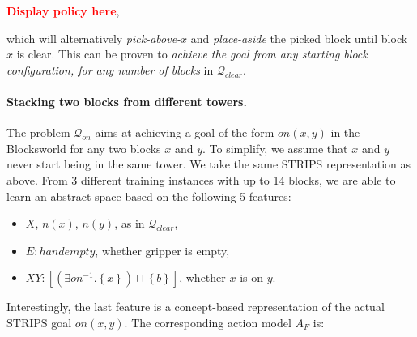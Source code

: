 \documentclass[letterpaper]{article} %
\newcommand{\set}[1]{\ensuremath{\left\{#1 \right\}}}
\newcommand{\alert}[1]{\textcolor{red}{\bf #1}}
\newcommand{\Q}{\mathcal{Q}}
\begin{document}
\alert{Display policy here},

\noindent which will alternatively \emph{pick-above-$x$} and \emph{place-aside} the picked block 
until block $x$ is clear. This can be proven to \emph{achieve the goal from any starting block configuration, for any number of blocks} in 
$\Q_{clear}$.

% 

% 

\paragraph{Stacking two blocks from different towers.}
The problem $\Q_{on}$ aims at achieving a goal of the form $on(x,y)$
in the Blocksworld for any two blocks $x$ and $y$.
To simplify, we assume that $x$ and $y$ never start being in the same tower.
We take the same STRIPS representation as above. From 3 different training instances with up to 14
blocks, we are able to learn an abstract space based on the following 5 features:

\begin{itemize}
\item $X$, $n(x)$, $n(y)$, as in $\Q_{clear}$,
\item $E: handempty$, whether gripper is empty,
\item $XY: [(\exists on^{-1} . \set{x})\sqcap \set{b}]$, whether $x$ is on $y$.
\end{itemize}

\noindent Interestingly, the last feature is a concept-based representation of the actual STRIPS goal $on(x,y)$.
The corresponding action model $A_F$ is:
\end{document}
